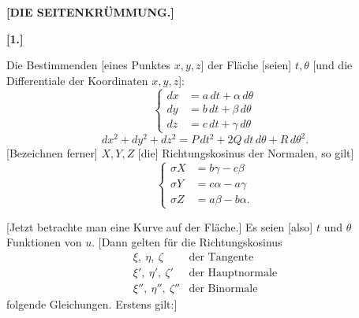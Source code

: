 \clearpage
{}%
\begin{center}\bfseries [DIE SEITENKRÜMMUNG.]\end{center}
\begin{center}\bfseries [1.]\end{center}
\noindent\hspace*{1.2em}Die Bestimmenden [eines Punktes $x,y,z$] der Fläche [seien] $t,\theta$ [und die Differentiale der Koordinaten $x,y,z$]:
\begin{equation}\tag*{[1]}
\left\{\begin{aligned}
dx&=a\,dt+\alpha\,d\theta\\
dy&=b\,dt+\beta\,d\theta\\
dz&=c\,dt+\gamma\,d\theta
\end{aligned}\right.
\end{equation}
\begin{equation}\tag*{[2]}
dx^2+dy^2+dz^2=P\,dt^2+2Q\,dt\,d\theta+R\,d\theta^2.
\end{equation}
[Bezeichnen ferner] $X,Y,Z$ [die] Richtungskosinus der Normalen, so gilt]
\begin{equation}\tag*{[3]}
\left\{\begin{aligned}
\sigma X&=b\gamma-c\beta\\
\sigma Y&=c\alpha-a\gamma\\
\sigma Z&=a\beta-b\alpha.
\end{aligned}\right.
\end{equation}

[Jetzt betrachte man eine Kurve auf der Fläche.] Es seien [also] $t$ und $\theta$ Funktionen von $u$. [Dann gelten für die Richtungskosinus
\[
\begin{array}{cl}
\xi,\ \eta,\ \zeta&\text{der Tangente}\\
\xi',\ \eta',\ \zeta'&\text{der Hauptnormale}\\
\xi'',\ \eta'',\ \zeta''&\text{der Binormale}
\end{array}
\]
folgende Gleichungen. Erstens gilt:]
